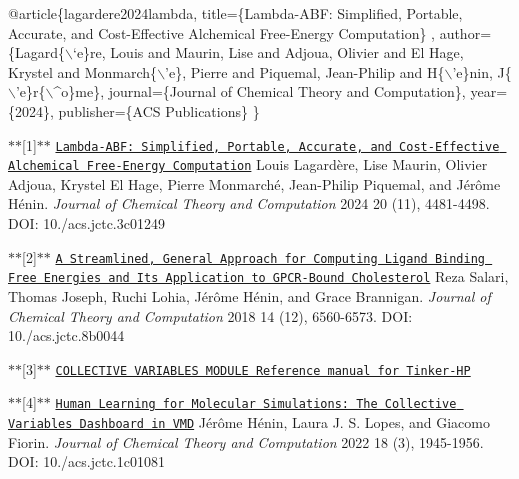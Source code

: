 \begin{DoxyCode}
@article\{lagardere2024lambda,
  title=\{Lambda-ABF: Simplified, Portable, Accurate, and Cost-Effective Alchemical Free-Energy Computation\}
      ,
  author=\{Lagard\{\(\backslash\)`e\}re, Louis and Maurin, Lise and Adjoua, Olivier and El Hage, Krystel and Monmarch\{\(\backslash\)\textcolor{stringliteral}{'e\},
       Pierre and Piquemal, Jean-Philip and H\{\(\backslash\)'e\}nin, J\{\(\backslash\)'e\}r\{\(\backslash\)^o\}me\},}
\textcolor{stringliteral}{  journal=\{Journal of Chemical Theory and Computation\},}
\textcolor{stringliteral}{  year=\{2024\},}
\textcolor{stringliteral}{  publisher=\{ACS Publications\}}
\textcolor{stringliteral}{\}}
\end{DoxyCode}
 



\label{md_lambda-abf_doxygen_ref1}%
\hypertarget{md_lambda-abf_doxygen_ref1}{}%
$\ast$$\ast$\mbox{[}1\mbox{]}$\ast$$\ast$ \href{https://doi.org/10.1021/acs.jctc.3c01249}{\tt Lambda-\/\-A\-B\-F\-: Simplified, Portable, Accurate, and Cost-\/\-Effective Alchemical Free-\/\-Energy Computation} Louis Lagardère, Lise Maurin, Olivier Adjoua, Krystel El Hage, Pierre Monmarché, Jean-\/\-Philip Piquemal, and Jérôme Hénin. {\itshape Journal of Chemical Theory and Computation} 2024 20 (11), 4481-\/4498. D\-O\-I\-: 10./acs.jctc.\-3c01249

\label{md_lambda-abf_doxygen_ref2}%
\hypertarget{md_lambda-abf_doxygen_ref2}{}%
$\ast$$\ast$\mbox{[}2\mbox{]}$\ast$$\ast$ \href{https://doi.org/10.1021/acs.jctc.8b00447}{\tt A Streamlined, General Approach for Computing Ligand Binding Free Energies and Its Application to G\-P\-C\-R-\/\-Bound Cholesterol} Reza Salari, Thomas Joseph, Ruchi Lohia, Jérôme Hénin, and Grace Brannigan. {\itshape Journal of Chemical Theory and Computation} 2018 14 (12), 6560-\/6573. D\-O\-I\-: 10./acs.jctc.\-8b0044

\label{md_lambda-abf_doxygen_ref3}%
\hypertarget{md_lambda-abf_doxygen_ref3}{}%
$\ast$$\ast$\mbox{[}3\mbox{]}$\ast$$\ast$ \href{https://colvars.github.io/master/colvars-refman-tinkerhp.pdf}{\tt C\-O\-L\-L\-E\-C\-T\-I\-V\-E V\-A\-R\-I\-A\-B\-L\-E\-S M\-O\-D\-U\-L\-E Reference manual for Tinker-\/\-H\-P}

\label{md_lambda-abf_doxygen_ref4}%
\hypertarget{md_lambda-abf_doxygen_ref4}{}%
$\ast$$\ast$\mbox{[}4\mbox{]}$\ast$$\ast$ \href{https://pubs.acs.org/doi/abs/10.1021/acs.jctc.1c01081}{\tt Human Learning for Molecular Simulations\-: The Collective Variables Dashboard in V\-M\-D} Jérôme Hénin, Laura J. S. Lopes, and Giacomo Fiorin. {\itshape Journal of Chemical Theory and Computation} 2022 18 (3), 1945-\/1956. D\-O\-I\-: 10./acs.jctc.\-1c01081

